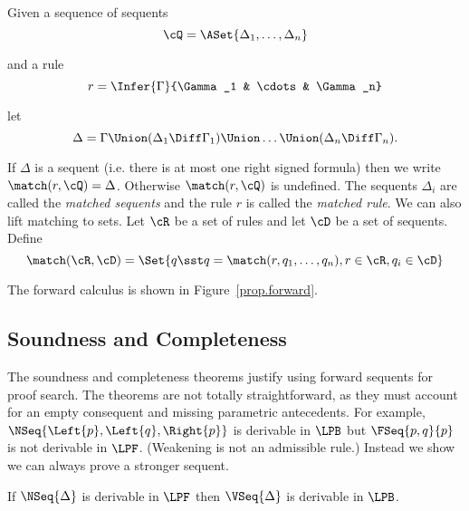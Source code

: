 \begin{definition}
  \label{prop.def.match1}

  Given a sequence of sequents
  \[
  \cQ = \ASet{\Delta_1, \ldots, \Delta_n}
  \]

  \noindent and a rule
  \[
  r = \Infer
  {\Gamma}
  {\Gamma_1 & \cdots & \Gamma_n}
  \]

  \noindent let
  \[
  \Delta = \Gamma\Union (\Delta_1\Diff\Gamma_1) \Union \dots\Union(\Delta_n\Diff\Gamma_n).
  \]

  \noindent
  If $\Delta$ is a sequent (i.e. there is at most one
  right signed formula) then we write
  $\match(r, \cQ) = \Delta$.  Otherwise $\match(r, \cQ)$ is undefined.
  The sequents $\Delta_i$ are called the \emph{matched sequents} and the
  rule $r$ is called the \emph{matched rule}.  We can also lift matching
  to sets.
  Let $\cR$ be a set of rules and let $\cD$ be a set of sequents.
  Define
  \[
  \match(\cR, \cD) = \Set{q\sst q=\match(r, q_1, \ldots, q_n), r\in\cR, q_i\in\cD}
  \]
\end{definition}

\noindent
The forward calculus is shown in Figure~\ref{prop.forward}.



%

\subsection{Soundness and Completeness}

The soundness and completeness theorems justify using forward sequents for proof
search.  The theorems are not totally straightforward, as they must account for
an empty consequent and missing parametric antecedents.  For example,
$\NSeq{\Left{p},\Left{q},\Right{p}}$ is derivable in $\LPB$ but
$\FSeq{p, q}{p}$ is not derivable in $\LPF$.
(Weakening is not an admissible rule.)  Instead we show we can always
prove a stronger sequent.

\begin{theorem}[Soundness]
  \label{prop.thm.forward-sound}
  If $\NSeq{\Delta}$ is derivable in $\LPF$ then
  $\VSeq{\Delta}$ is derivable in $\LPB$.
\end{theorem}


